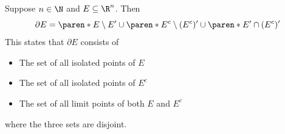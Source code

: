 \bigskip

\begin{theorem} \label{an:thm:properties-of-boundary-in-rn}
  Suppose $n \in \N$ and $E \subseteq \R^{n}$. Then
  \[
    \partial E = \paren*{E \setminus E'} \cup \paren*{E^{c} \setminus (E^{c})'} \cup \paren*{E' \cap (E^{c})'}
  \]
  This states that $\partial E$ consists of
  \begin{itemize}
    \item The set of all isolated points of $E$
    \item The set of all isolated points of $E^{c}$
    \item The set of all limit points of both $E$ and $E^{c}$
  \end{itemize}
  where the three sets are disjoint.
\end{theorem}

